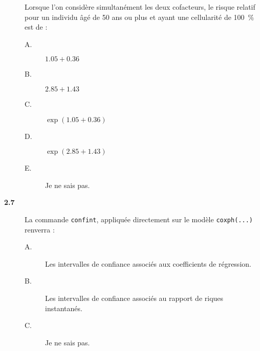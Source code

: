 \documentclass[11pt]{report}
\theoremstyle{definition}
\newcommand{\blankpage}{
  \newpage
  \thispagestyle{empty}
  \mbox{}
  \newpage
  }
\begin{document}
\begin{description}
  Lorsque l'on considère simultanément les deux cofacteurs, le risque
  relatif pour un individu âgé de 50 ans ou plus et ayant une cellularité de
  100~\% est de :
  \begin{description}
  \item[A.] $1.05 + 0.36$
  \item[B.] $2.85 + 1.43$
  \item[C.] $\exp(1.05 + 0.36)$
  \item[D.] $\exp(2.85 + 1.43)$    
  \item[E.] Je ne sais pas.
  \end{description}
\item[\bf 2.7]  La commande \texttt{confint},
  appliquée directement sur le modèle \texttt{coxph(...)} renverra :
  \begin{description}
  \item[A.] Les intervalles de confiance associés aux coefficients de
    régression. 
  \item[B.] Les intervalles de confiance associés au rapport de riques instantanés.
  \item[C.] Je ne sais pas.
  \end{description}  
\end{description}

\blankpage
\blankpage
\end{document}
